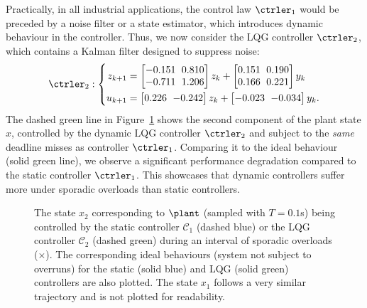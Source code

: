 \begin{example}
    Practically, in all industrial applications, the control law $\ctrler_1$ would be preceded by a noise filter or a state estimator, which introduces dynamic behaviour in the controller. 
    Thus, we now consider the LQG controller $\ctrler_2$, which contains a Kalman filter designed to suppress noise: 
    \begin{equation*}
        {\setlength\arraycolsep{3pt}
        \ctrler_2 : \left\{
        \begin{aligned}
            z_{k+1} &=
            \begin{bmatrix}
                -0.151 & 0.810 \\
                -0.711 & 1.206
            \end{bmatrix} z_k + 
            \begin{bmatrix}
                0.151 & 0.190 \\
                0.166 & 0.221
            \end{bmatrix} y_k \\
            u_{k+1} &=
            \begin{bmatrix}
                0.226 & -0.242
            \end{bmatrix} z_{k} +
            \begin{bmatrix}
                -0.023 & -0.034
            \end{bmatrix} y_k .
            \end{aligned}
        \right.}
    \end{equation*}
    The dashed green line in Figure~\ref{fig:lqr-lqg} shows the second component of the plant state $x$, controlled by the dynamic LQG controller $\ctrler_2$ and subject to the \emph{same} deadline misses as controller $\ctrler_1$.
    Comparing it to the ideal behaviour (solid green line), we observe a significant performance degradation compared to the static controller $\ctrler_1$.
    This showcases that dynamic controllers suffer more under sporadic overloads than static controllers.
\end{example}

\begin{figure}[t]
    \centerline{}
    \caption{The state $x_2$ corresponding to $\plant$ (sampled with $T=0.1$s) being controlled by the static controller $\mathcal{C}_1$ (dashed blue) or the LQG controller $\mathcal{C}_2$ (dashed green) during an interval of sporadic overloads ($\times$).
        The corresponding ideal behaviours (system not subject to overruns) for the static (solid blue) and LQG (solid green) controllers are also plotted.
        The state $x_1$ follows a very similar trajectory and is not plotted for readability.}
    \label{fig:lqr-lqg}
\end{figure}

